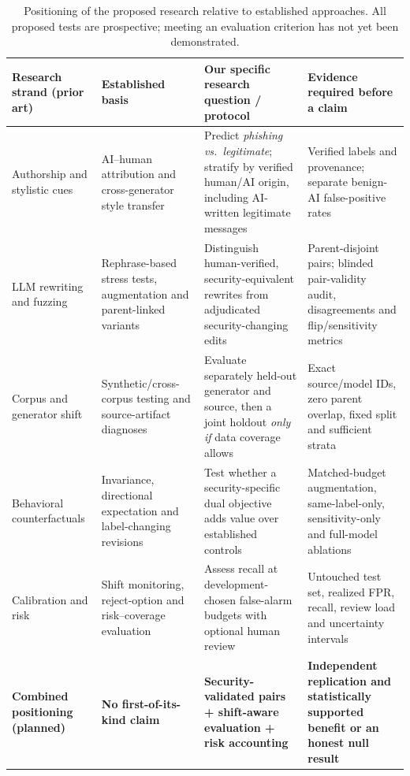 \begin{table}[!htbp]
\centering
\caption{Positioning of the proposed research relative to established
approaches. All proposed tests are prospective; meeting an evaluation
criterion has not yet been demonstrated.}
\label{tab:our_positioning}
\footnotesize
\renewcommand{\arraystretch}{1.17}
\begin{tabularx}{\linewidth}{@{}p{2.45cm}X X X@{}}
\toprule
Research strand (prior art) &
Established basis &
Our specific research question / protocol &
Evidence required before a claim \\
\midrule
Authorship and stylistic cues
\cite{opara2025stylometry,gutierrez2026crossmodel,commey2026cuephish} &
AI--human attribution and cross-generator style transfer &
Predict \emph{phishing vs.\ legitimate}; stratify by verified human/AI origin, including AI-written legitimate messages &
Verified labels and provenance; separate benign-AI false-positive rates \\
\addlinespace[2pt]
LLM rewriting and fuzzing
\cite{ferrell2025rephrasing,nance2025augmentation,toth2026phishfuzzer} &
Rephrase-based stress tests, augmentation and parent-linked variants &
Distinguish human-verified, security-equivalent rewrites from adjudicated security-changing edits &
Parent-disjoint pairs; blinded pair-validity audit, disagreements and flip/sensitivity metrics \\
\addlinespace[2pt]
Corpus and generator shift
\cite{pajola2025ephishgen,bhuiyan2026fragility} &
Synthetic/cross-corpus testing and source-artifact diagnoses &
Evaluate separately held-out generator and source, then a joint holdout \emph{only if} data coverage allows &
Exact source/model IDs, zero parent overlap, fixed split and sufficient strata \\
\addlinespace[2pt]
Behavioral counterfactuals
\cite{ribeiro2020checklist,gardner2020contrast,kaushik2020cad} &
Invariance, directional expectation and label-changing revisions &
Test whether a security-specific dual objective adds value over established controls &
Matched-budget augmentation, same-label-only, sensitivity-only and full-model ablations \\
\addlinespace[2pt]
Calibration and risk
\cite{arharbi2026shifts,geifman2019selectivenet} &
Shift monitoring, reject-option and risk--coverage evaluation &
Assess recall at development-chosen false-alarm budgets with optional human review &
Untouched test set, realized FPR, recall, review load and uncertainty intervals \\
\midrule
\textbf{Combined positioning (planned)} &
\textbf{No first-of-its-kind claim} &
\textbf{Security-validated pairs + shift-aware evaluation + risk accounting} &
\textbf{Independent replication and statistically supported benefit or an honest null result} \\
\bottomrule
\end{tabularx}
\end{table}
